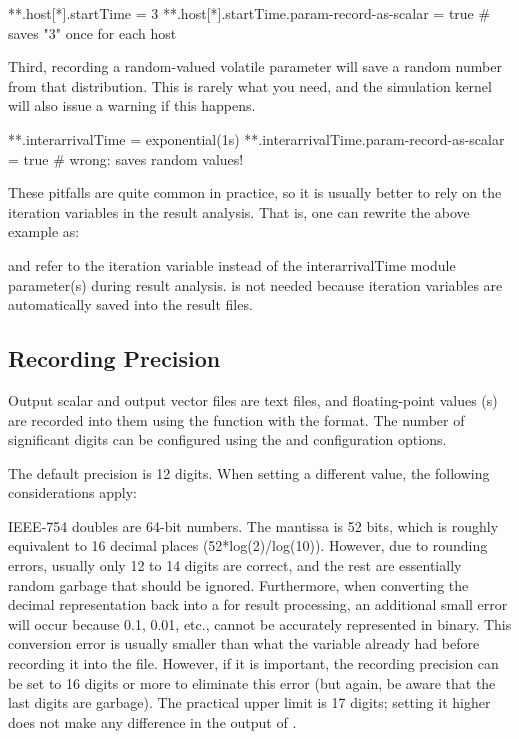 \begin{inifile}
**.host[*].startTime = 3
**.host[*].startTime.param-record-as-scalar = true  # saves "3" once for each host
\end{inifile}

Third, recording a random-valued volatile parameter will save a random number
from that distribution. This is rarely what you need, and the simulation kernel
will also issue a warning if this happens.

\begin{inifile}
**.interarrivalTime = exponential(1s)
**.interarrivalTime.param-record-as-scalar = true  # wrong: saves random values!
\end{inifile}

These pitfalls are quite common in practice, so it is usually better to rely on
the iteration variables in the result analysis. That is, one can rewrite the
above example as:


and refer to the  iteration variable instead of the interarrivalTime
module parameter(s) during result analysis.  is
not needed because iteration variables are automatically saved into the result
files.

\subsection{Recording Precision}
\label{sec:ana-sim:outputfile-precision}

Output scalar and output vector files are text files, and floating-point values
(s) are recorded into them using the  function with
the  format. The number of significant digits can be configured using
the  and 
configuration options.

The default precision is 12 digits. When setting a different value, the
following considerations apply:

IEEE-754 doubles are 64-bit numbers. The mantissa is 52 bits, which is roughly
equivalent to 16 decimal places (52*log(2)/log(10)). However, due to rounding
errors, usually only 12 to 14 digits are correct, and the rest are essentially
random garbage that should be ignored. Furthermore, when converting the decimal
representation back into a  for result processing, an additional
small error will occur because 0.1, 0.01, etc., cannot be accurately represented
in binary. This conversion error is usually smaller than what the 
variable already had before recording it into the file. However, if it is
important, the recording precision can be set to 16 digits or more to eliminate
this error (but again, be aware that the last digits are garbage). The practical
upper limit is 17 digits; setting it higher does not make any difference in the
output of .

